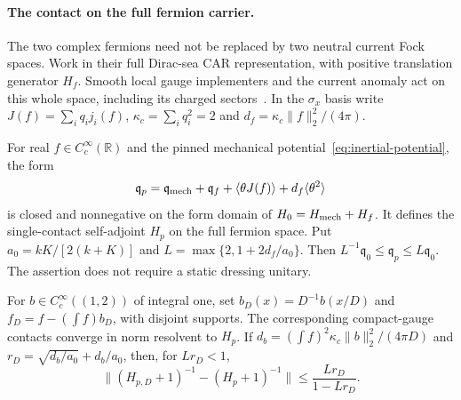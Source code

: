 \paragraph{The contact on the full fermion carrier.}
The two complex fermions need not be replaced by two neutral current
Fock spaces. Work in their full Dirac-sea CAR representation, with
positive translation generator $H_f$. Smooth local gauge implementers
and the current anomaly act on this whole space, including its charged
sectors~\cite[Sections~3.2--3.3 and Appendices~A--B]{CareyLangmann1998}.
In the $\sigma_x$ basis write
$J(f)=\sum_iq_i j_i(f)$, $\kappa_c=\sum_iq_i^2=2$ and
$d_f=\kappa_c\|f\|_2^2/(4\pi)$.

\begin{proposition}
\label{prop:full-fermion-contact}
For real $f\in C_c^\infty(\mathbb R)$ and the pinned mechanical
potential~\eqref{eq:inertial-potential}, the form
\[
 \mathfrak q_p=\mathfrak q_{\rm mech}+\mathfrak q_f
       +\langle\theta J(f)\rangle+d_f\langle\theta^2\rangle
\]
is closed and nonnegative on the form domain of
$H_0=H_{\rm mech}+H_f$. It defines the single-contact self-adjoint
$H_p$ on the full fermion space. Put
$a_0=kK/[2(k+K)]$ and $L=\max\{2,1+2d_f/a_0\}$.
Then $L^{-1}\mathfrak q_0\le\mathfrak q_p\le L\mathfrak q_0$.
The assertion does not require a static dressing unitary.

For $b\in C_c^\infty((1,2))$ of integral one, set
$b_D(x)=D^{-1}b(x/D)$ and
$f_D=f-(\int f)b_D$, with disjoint supports. The corresponding
compact-gauge contacts converge in norm resolvent to $H_p$.
If $d_b=(\int f)^2\kappa_c\|b\|_2^2/(4\pi D)$ and
$r_D=\sqrt{d_b/a_0}+d_b/a_0$, then, for $Lr_D<1$,
\[
 \|(H_{p,D}+1)^{-1}-(H_p+1)^{-1}\|
       \le\frac{Lr_D}{1-Lr_D}.
\]
\end{proposition}
